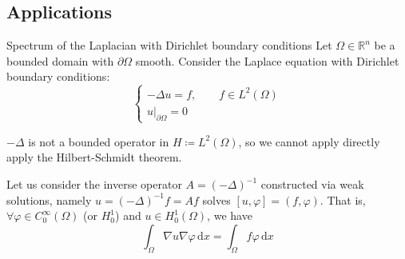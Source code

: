 \documentclass{report}
\begin{document}
\subsection*{Applications}
\begin{example}{Spectrum of the Laplacian with Dirichlet boundary conditions}{}
    Let \(\Omega \in \mathbb{R}^{n}\) be a bounded domain with \(\partial \Omega\) smooth. Consider the Laplace equation with Dirichlet boundary conditions:
    \begin{equation*}
        \begin{cases}
            - \Delta u = f, \qquad f \in L^{2}(\Omega) \\
            \left. u \right|_{\partial \Omega} = 0
        \end{cases}
    \end{equation*}

    \(- \Delta\) is not a bounded operator in \(H \coloneqq L^{2}(\Omega)\), so we cannot apply directly apply the Hilbert-Schmidt theorem.

    Let us consider the inverse operator \(A = (- \Delta)^{-1}\) constructed via weak solutions, namely \(u = (- \Delta)^{-1}f = Af\) solves \([u, \varphi] = (f, \varphi)\). That is, \(\forall \varphi \in C^{\infty}_{0}(\Omega)\) (or \(H^{1}_{0}\)) and \(u \in H^{1}_{0}(\Omega)\), we have
    \[
        \int_{\Omega} \nabla u \nabla \varphi \,\mathrm{d}x = \int_{\Omega} f \varphi \,\mathrm{d}x
    \]


\end{example}
\end{document}
